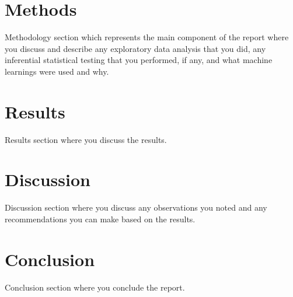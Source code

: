 \documentclass[11pt,a4paper,final]{article}
\begin{document}
\section{Methods}
Methodology section which represents the main component of the report where you discuss and describe any exploratory data analysis that you did, any inferential statistical testing that you performed, if any, and what machine learnings were used and why.
\section{Results}
Results section where you discuss the results.
\section{Discussion}
Discussion section where you discuss any observations you noted and any recommendations you can make based on the results.
\section{Conclusion}
Conclusion section where you conclude the report.
\end{document}
